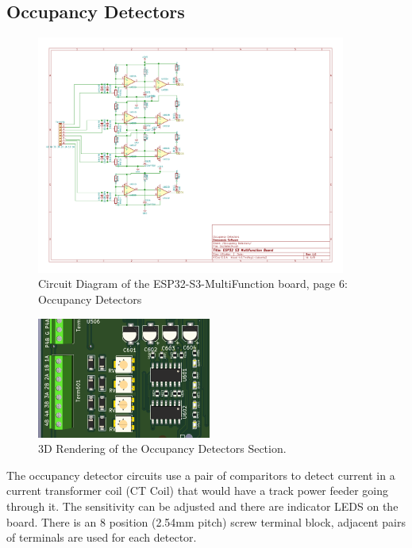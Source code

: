 \clearpage
\subsection{Occupancy Detectors}
\begin{figure}[hbpt]\begin{centering}%
\includegraphics[width=4in]{ESP32-S3-MultiFunction-6.pdf}
\caption{Circuit Diagram of the ESP32-S3-MultiFunction board, page 6: 
Occupancy Detectors}
\end{centering}\end{figure}
\begin{figure}[hbpt]\begin{centering}%
\includegraphics{ESP32-S3-MultiFunction-top3D-OccupancyDetectors.png}
\caption{3D Rendering of the Occupancy Detectors Section.}
\end{centering}\end{figure}

The occupancy detector circuits use a pair of comparitors to detect current in 
a current transformer coil (CT Coil) that would have a track power feeder 
going through it.  The sensitivity can be adjusted and there are indicator 
LEDS on the board.  There is an 8 position (2.54mm pitch) screw terminal 
block, adjacent pairs of terminals are used for each detector.

